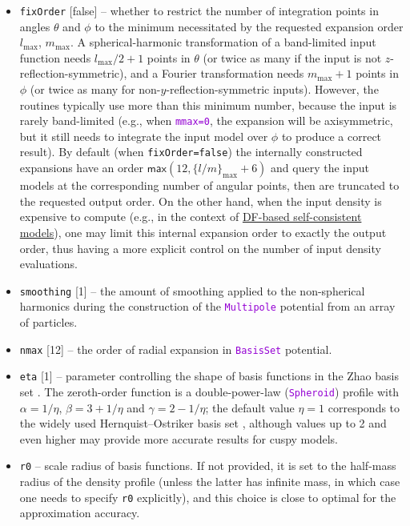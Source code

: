 \documentclass[12pt]{article}
\newcommand{\ttt}[1]{\textcolor{darkviolet}{\texttt{#1}}}
\newcommand{\ppp}[1]{\textcolor{darkolive} {\texttt{#1}}}
\begin{document}
\begin{itemize}
\item \ppp{fixOrder} [false] -- whether to restrict the number of integration points in angles $\theta$ and $\phi$ to the minimum necessitated by the requested expansion order $l_\mathrm{max}$, $m_\mathrm{max}$. A spherical-harmonic transformation of a band-limited input function needs $l_\mathrm{max}/2+1$ points in $\theta$ (or twice as many if the input is not $z$-reflection-symmetric), and a Fourier transformation needs $m_\mathrm{max}+1$ points in $\phi$ (or twice as many for non-$y$-reflection-symmetric inputs). However, the routines typically use more than this minimum number, because the input is rarely band-limited (e.g., when \ttt{mmax=0}, the expansion will be axisymmetric, but it still needs to integrate the input model over $\phi$ to produce a correct result). By default (when \ppp{fixOrder=false}) the internally constructed expansions have an order $\mathsf{max}(12, \{l/m\}_\mathrm{max}+6)$ and query the input models at the corresponding number of angular points, then are truncated to the requested output order. On the other hand, when the input density is expensive to compute (e.g., in the context of \hyperref[sec:SCM]{DF-based self-consistent models}), one may limit this internal expansion order to exactly the output order, thus having a more explicit control on the number of input density evaluations.
\item \ppp{smoothing} [1] -- the amount of smoothing applied to the non-spherical harmonics during the construction of the \ttt{Multipole} potential from an array of particles.
\item \ppp{nmax} [12] -- the order of radial expansion in \ttt{BasisSet} potential.
\item \ppp{eta} [1] -- parameter controlling the shape of basis functions in the Zhao basis set \cite{Zhao1996}. The zeroth-order function is a double-power-law (\ttt{Spheroid}) profile with $\alpha=1/\eta$, $\beta=3+1/\eta$ and $\gamma=2-1/\eta$; the default value $\eta=1$ corresponds to the widely used Hernquist--Ostriker basis set \cite{HernquistOstriker1992}, although values up to 2 and even higher may provide more accurate results for cuspy models.
\item \ppp{r0} -- scale radius of basis functions. If not provided, it is set to the half-mass radius of the density profile (unless the latter has infinite mass, in which case one needs to specify \ppp{r0} explicitly), and this choice is close to optimal for the approximation accuracy.
\end{itemize}
\end{document}
